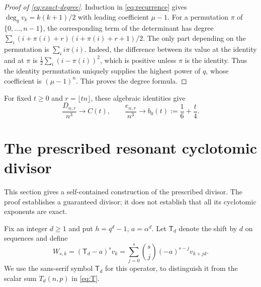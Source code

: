 \documentclass[11pt]{article}
\numberwithin{equation}{section}
\theoremstyle{definition}
\theoremstyle{remark}
\newcommand{\degq}{\operatorname{deg}_q}
\begin{document}
\begin{proof}[Proof of \eqref{eq:exact-degree}]
Induction in \eqref{eq:recurrence} gives
$\degq v_k=k(k+1)/2$ with leading coefficient $\mu-1$.
For a permutation $\pi$ of $\{0,\ldots,n-1\}$, the corresponding
term of the determinant has degree
$\sum_i(i+\pi(i)+r)(i+\pi(i)+r+1)/2$.
The only part depending on the permutation is $\sum_i i\pi(i)$.
Indeed, the difference between its value at the identity and at $\pi$ is
$\frac12\sum_i(i-\pi(i))^2$, which is positive unless $\pi$ is the identity.
Thus the identity permutation uniquely supplies the highest power of $q$,
whose coefficient is $(\mu-1)^n$. This proves the degree formula.
\end{proof}
For fixed $t\ge0$ and $r=\lfloor tn\rfloor$, these algebraic identities give
\begin{equation}\label{eq:algebra-rates}
 \frac{D_{n,r}}{n^3}\longrightarrow C(t),\qquad
 \frac{e_{n,r}}{n^3}\longrightarrow b_0(t):=\frac16+\frac t4.
\end{equation}

\section{The prescribed resonant cyclotomic divisor}\label{sec:cyclotomic}

This section gives a self-contained construction of the prescribed divisor.
The proof establishes a guaranteed divisor; it does not establish that all
its cyclotomic exponents are exact.

Fix an integer $d\ge1$ and put $h=q^d-1$, $a=\alpha^d$. Let $\mathsf T_d$
denote the shift by $d$ on sequences and define
\begin{equation}\label{eq:W}
 W_{s,k}=(\mathsf T_d-a)^s v_k
 =\sum_{j=0}^{s}\binom sj(-a)^{s-j}v_{k+jd}.
\end{equation}
We use the sans-serif symbol $\mathsf T_d$ for this operator, to distinguish
it from the scalar sum $T_d(n,p)$ in \eqref{eq:T}.
\end{document}
